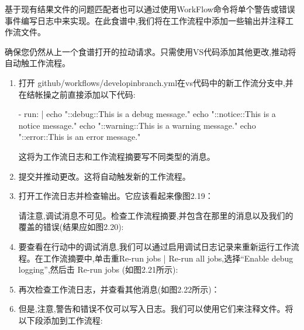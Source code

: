 
基于现有结果文件的问题匹配者也可以通过使用WorkFlow命令将单个警告或错误事件编写日志中来实现。在此食谱中,我们将在工作流程中添加一些输出并注释工作流文件。


确保您仍然从上一个食谱打开的拉动请求。只需使用VS代码添加其他更改,推动将自动触工作流程。


\begin{enumerate}
\item 
打开 github/workflows/developinbranch.yml在vs代码中的新工作流分支中,并在结帐操之前直接添加以下代码:

\begin{shell}
- run: |
  echo "::debug::This is a debug message."
  echo "::notice::This is a notice message."
  echo "::warning::This is a warning message."
  echo "::error::This is an error message."
\end{shell}

这将为工作流日志和工作流程摘要写不同类型的消息。

\item 
提交并推动更改。这将自动触发新的工作流程。

\item 
打开工作流日志并检查输出。它应该看起来像图2.19：


请注意,调试消息不可见。检查工作流程摘要,并包含在那里的消息以及我们的覆盖的错误(结果应如图2.20):


\item 
要查看在行动中的调试消息,我们可以通过启用调试日志记录来重新运行工作流程。在工作流摘要中,单击重Re-run jobs | Re-run all jobs,选择“Enable debug logging”,然后击 Re-run jobs (如图2.21所示):


\item 
再次检查工作流日志，并查看其他消息(如图2.22所示)：


\item 
但是,注意,警告和错误不仅可以写入日志。我们可以使用它们来注释文件。将以下段添加到工作流程:


\end{enumerate}
